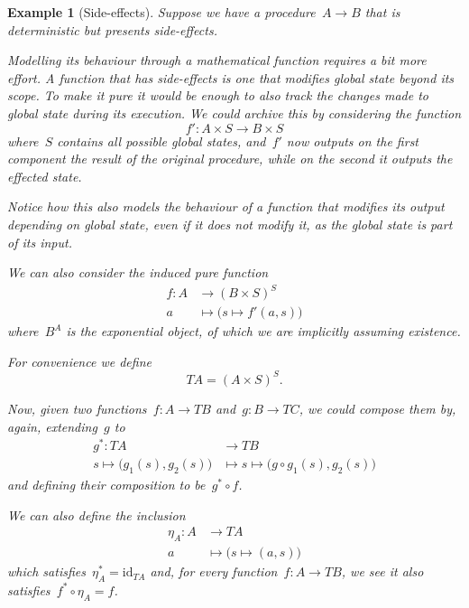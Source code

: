 \documentclass[a4paper]{article}
\theoremstyle{plain}
\newtheorem{example}[theorem]{Example}
\theoremstyle{definition}
\newcommand{\id}{\mathrm{id}}
\begin{document}
\begin{example}[Side-effects]
    \label{ex:kleisli-side-effects}
    Suppose we have a procedure~\(A\longrightarrow B\) that is deterministic but
    presents side-effects.

    Modelling its behaviour through a mathematical function requires a bit more
    effort. A function that has side-effects is one that modifies global state
    beyond its scope. To make it pure it would be enough to also track the
    changes made to global state during its execution.  We could archive this by
    considering the function
    \[
        f':A\times S\longrightarrow B\times S
    \]
    where~\(S\) contains all possible global states, and~\(f'\) now outputs on
    the first component the result of the original procedure, while on the
    second it outputs the effected state.

    Notice how this also models the behaviour of a function that modifies its
    output depending on global state, even if it does not modify it, as the
    global state is part of its input.

    We can also consider the induced pure function
    \begin{align*}
        f:A&\longrightarrow(B\times S)^{S} \\
        a&\longmapsto\bigr(s\mapsto f'(a,s)\bigl)
    \end{align*}
    where~\(B^{A}\) is the exponential object, of which we are implicitly
    assuming existence.

    For convenience we define
    \[
        TA = (A\times S)^{S}.
    \]

    Now, given two functions~\(f:A\longrightarrow TB\)
    and~\(g:B\longrightarrow TC\), we could compose them by, again,
    extending~\(g\) to
    \begin{align*}
        g^{\ast}:TA&\longrightarrow TB \\
        s\mapsto\bigl(g_{1}(s),g_{2}(s)\bigr)&\longmapsto
        s\mapsto\bigl(g\circ g_{1}(s),g_{2}(s)\bigr)
    \end{align*}
    and defining their composition to be~\(g^{\ast} \circ f\).

    We can also define the inclusion
    \begin{align*}
        \eta_{A}:A&\longrightarrow TA \\
        a&\longmapsto\bigl(s\mapsto(a,s)\bigr)
    \end{align*}
    which satisfies~\(\eta_{A}^{\ast}=\id_{TA}\) and, for every
    function~\(f:A\longrightarrow TB\), we see it also
    satisfies~\(f^{\ast}\circ\eta_{A}=f\).
\end{example}
\end{document}
